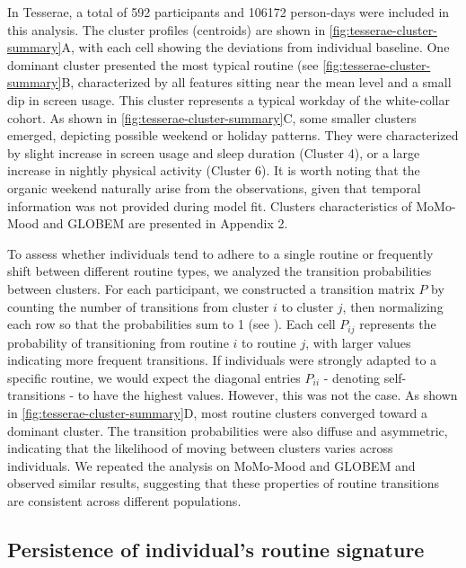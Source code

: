 \documentclass[pdflatex,sn-vancouver,Numbered]{bst/sn-jnl}%
\theoremstyle{thmstyleone}%
\theoremstyle{thmstyletwo}%
\theoremstyle{thmstylethree}%
\begin{document}
In Tesserae, a total of 592 participants and 106172 person-days were included in this analysis. The cluster profiles (centroids) are shown in \autoref{fig:tesserae-cluster-summary}A, with each cell showing the deviations from individual baseline.  One dominant cluster presented the most typical routine (see \autoref{fig:tesserae-cluster-summary}B, characterized by all features sitting near the mean level and a small dip in screen usage. This cluster represents a typical workday of the white-collar cohort. As shown in \autoref{fig:tesserae-cluster-summary}C, some smaller clusters emerged, depicting possible weekend or holiday patterns. They were characterized by slight increase in screen usage and sleep duration (Cluster 4), or a large increase in nightly physical activity (Cluster 6). It is worth noting that the organic weekend naturally arise from the observations, given that temporal information was not provided during model fit. Clusters characteristics of MoMo-Mood and GLOBEM are presented in Appendix 2.

To assess whether individuals tend to adhere to a single routine or frequently shift between different routine types, we analyzed the transition probabilities between clusters. For each participant, we constructed a transition matrix \(P\) by counting the number of transitions from cluster \(i\) to cluster \(j\), then normalizing each row so that the probabilities sum to 1 (see ). Each cell \(P_{ij}\) represents the probability of transitioning from routine \(i\) to routine \(j\), with larger values indicating more frequent transitions. If individuals were strongly adapted to a specific routine, we would expect the diagonal entries \(P_{ii}\) - denoting self-transitions - to have the highest values. However, this was not the case. As shown in \autoref{fig:tesserae-cluster-summary}D, most routine clusters converged toward a dominant cluster. The transition probabilities were also diffuse and asymmetric, indicating that the likelihood of moving between clusters varies across individuals. We repeated the analysis on MoMo-Mood and GLOBEM and observed similar results, suggesting that these properties of routine transitions are consistent across different populations.


\subsection*{Persistence of individual's routine signature} \label{sec:results:signature_persistence}
\end{document}

